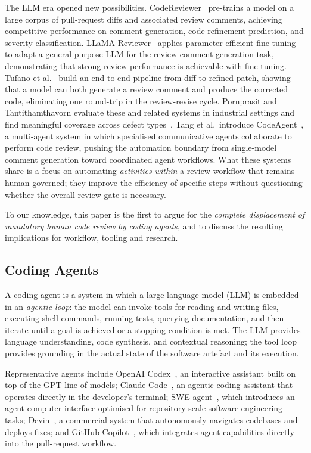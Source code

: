 \documentclass[10pt,conference]{IEEEtran}
\begin{document}
The LLM era opened new possibilities.
CodeReviewer~\cite{li2022codereviewer} pre-trains a model on a large corpus of pull-request diffs and associated review comments, achieving competitive performance on comment generation, code-refinement prediction, and severity classification.
LLaMA-Reviewer~\cite{lu2023llama} applies parameter-efficient fine-tuning to adapt a general-purpose LLM for the review-comment generation task, demonstrating that strong review performance is achievable with fine-tuning.
Tufano et al.~\cite{tufano2021using} build an end-to-end pipeline from diff to refined patch, showing that a model can both generate a review comment and produce the corrected code, eliminating one round-trip in the review-revise cycle.
Pornprasit and Tantithamthavorn evaluate these and related systems in industrial settings and find meaningful coverage across defect types~\cite{pornprasit2023automated}.
Tang et al.\ introduce CodeAgent~\cite{tang2024codeagent}, a multi-agent system in which specialised communicative agents collaborate to perform code review, pushing the automation boundary from single-model comment generation toward coordinated agent workflows.
What these systems share is a focus on automating \emph{activities within} a review workflow that remains human-governed; they improve the efficiency of specific steps without questioning whether the overall review gate is necessary.

To our knowledge, this paper is the first to argue for the \emph{complete displacement of mandatory human code review by coding agents}, and to discuss the resulting implications for workflow, tooling and research.

\subsection{Coding Agents}

A coding agent is a system in which a large language model (LLM) is embedded in an \emph{agentic loop}: the model can invoke tools for reading and writing files, executing shell commands, running tests, querying documentation, and then iterate until a goal is achieved or a stopping condition is met.
The LLM provides language understanding, code synthesis, and contextual reasoning; the tool loop provides grounding in the actual state of the software artefact and its execution.

Representative agents include OpenAI Codex~\cite{chen2021evaluating}, an interactive assistant built on top of the GPT line of models; Claude Code~\cite{anthropic2024claude}, an agentic coding assistant that operates directly in the developer's terminal; SWE-agent~\cite{yang2024sweagent}, which introduces an agent-computer interface optimised for repository-scale software engineering tasks; Devin~\cite{cognition2024devin}, a commercial system that autonomously navigates codebases and deploys fixes; and GitHub Copilot~\cite{github2024copilotworkspace}, which integrates agent capabilities directly into the pull-request workflow.
\end{document}
